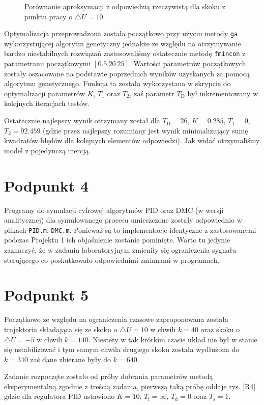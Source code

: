 \begin{figure}[ht]
\centering

\caption{Porównanie aproksymacji z odpowiedzią rzeczywistą dla skoku z punktu pracy o $\triangle U = 10$}
\label{R3}
\end{figure}

Optymalizacja przeprowadzona została początkowo przy użyciu metody \verb+ga+ wykorzystującej algorytm genetyczny jednakże ze względu na otrzymywanie bardzo niestabilnych rozwiązań zastosowaliśmy ostatecznie metodę \verb+fmincon+ z parametrami początkowymi $[\num{0,5} ~ 20 ~ 25]$. Wartości parametrów początkowych zostały oszacowane na podstawie poprzednich wyników uzyskanych za pomocą algorytmu genetycznego. Funkcja ta została wykorzystana w skrypcie do optymalizacji parametrów $K$, $T_1$ oraz $T_2$, zaś parametr $T_{\mathrm{D}}$ był inkrementowany w kolejnych iteracjach testów.

Ostatecznie najlepszy wynik otrzymany został dla $T_{\mathrm{D}}=26$, $K=\num{0.285}$, $T_1=\num{0}$, $T_2=\num{92.459}$ (gdzie przez najlepszy rozumiany jest wynik minimalizujący sumę kwadratów błędów dla kolejnych elementów odpowiedzi). Jak widać otrzymaliśmy model z pojedynczą inercją.

\chapter{Podpunkt 4}
Programy do symulacji cyfrowej algorytmów PID oraz DMC (w wersji analitycznej) dla symulowanego procesu umieszczone zostały odpowiednio w plikach \verb+PID.m+, \verb+DMC.m+. Ponieważ są to implementacje identyczne z zastosowanymi podczas Projektu 1 ich objaśnienie zostanie pominięte. Warto tu jedynie zaznaczyć, że w zadaniu laboratoryjnym zmieniły się ograniczenia sygnału sterującego co poskutkowało odpowiednimi zmianami w programach.

\chapter{Podpunkt 5}
Początkowo ze względu na ograniczenia czasowe zaproponowana została trajektoria składająca się ze skoku o $\triangle U=10$ w chwili $k=40$ oraz skoku o $\triangle U=-5$ w chwili $k=140$. Niestety w tak krótkim czasie układ nie był w stanie się ustabilizować i tym samym chwila drugiego skoku została wydłużona do $k=340$ zaś dane zbierane były do $k=640$.

Zadanie rozpoczęte zostało od próby dobrania parametrów metodą eksperymentalną zgodnie z treścią zadania, pierwszą taką próbę oddaje rys. \ref{R4} gdzie dla regulatora PID ustawiono $K=10$, $T_{\mathrm{i}}=\infty$, $T_{\mathrm{d}}=0$ oraz $T_{\mathrm{s}}=1$.

